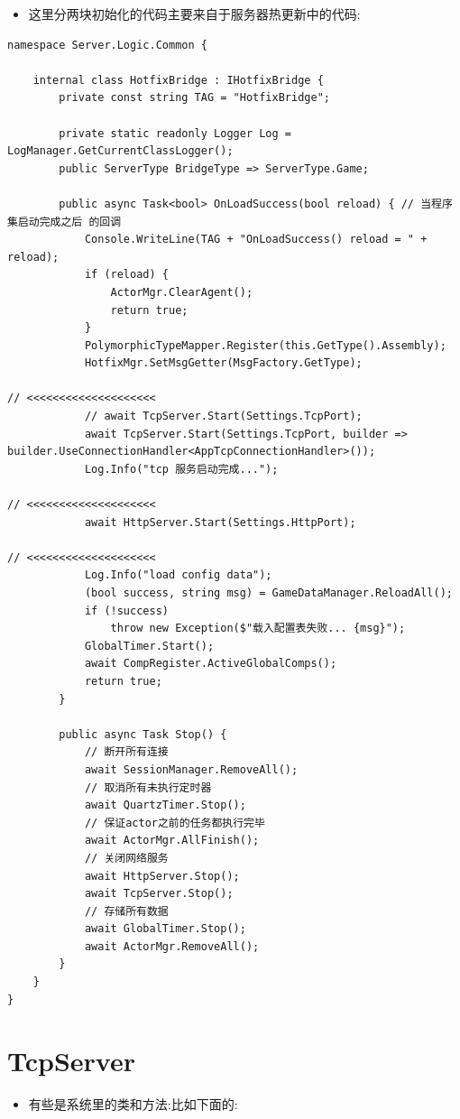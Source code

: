 \documentclass[9pt, b5paper]{article}
\begin{document}
\begin{itemize}
\item 这里分两块初始化的代码主要来自于服务器热更新中的代码:
\end{itemize}
\begin{verbatim}
namespace Server.Logic.Common {

    internal class HotfixBridge : IHotfixBridge {
        private const string TAG = "HotfixBridge";

        private static readonly Logger Log = LogManager.GetCurrentClassLogger();
        public ServerType BridgeType => ServerType.Game;

        public async Task<bool> OnLoadSuccess(bool reload) { // 当程序集启动完成之后 的回调
            Console.WriteLine(TAG + "OnLoadSuccess() reload = " + reload);
            if (reload) {
                ActorMgr.ClearAgent();
                return true;
            }
            PolymorphicTypeMapper.Register(this.GetType().Assembly);
            HotfixMgr.SetMsgGetter(MsgFactory.GetType);

// <<<<<<<<<<<<<<<<<<<< 
            // await TcpServer.Start(Settings.TcpPort);
            await TcpServer.Start(Settings.TcpPort, builder => builder.UseConnectionHandler<AppTcpConnectionHandler>());
            Log.Info("tcp 服务启动完成...");

// <<<<<<<<<<<<<<<<<<<< 
            await HttpServer.Start(Settings.HttpPort);

// <<<<<<<<<<<<<<<<<<<< 
            Log.Info("load config data");
            (bool success, string msg) = GameDataManager.ReloadAll();
            if (!success)
                throw new Exception($"载入配置表失败... {msg}");
            GlobalTimer.Start();
            await CompRegister.ActiveGlobalComps();
            return true;
        }

        public async Task Stop() {
            // 断开所有连接
            await SessionManager.RemoveAll();
            // 取消所有未执行定时器
            await QuartzTimer.Stop();
            // 保证actor之前的任务都执行完毕
            await ActorMgr.AllFinish();
            // 关闭网络服务
            await HttpServer.Stop();
            await TcpServer.Stop();
            // 存储所有数据
            await GlobalTimer.Stop();
            await ActorMgr.RemoveAll();
        }
    }
}
\end{verbatim}

\section{TcpServer}
\label{sec-2}
\begin{itemize}
\item 有些是系统里的类和方法:比如下面的:
\end{itemize}
\end{document}
